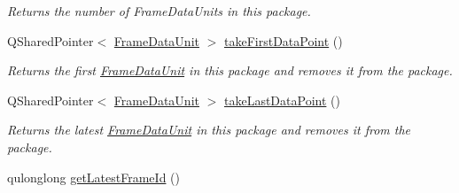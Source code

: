 \begin{DoxyCompactItemize}
\begin{DoxyCompactList}\small\item\em Returns the number of Frame\-Data\-Units in this package. \end{DoxyCompactList}\item 
\hypertarget{class_picto_1_1_frame_data_unit_package_ac9a9c94ea43a4bda078eb9ff56e3058d}{Q\-Shared\-Pointer$<$ \hyperlink{class_picto_1_1_frame_data_unit}{Frame\-Data\-Unit} $>$ \hyperlink{class_picto_1_1_frame_data_unit_package_ac9a9c94ea43a4bda078eb9ff56e3058d}{take\-First\-Data\-Point} ()}\label{class_picto_1_1_frame_data_unit_package_ac9a9c94ea43a4bda078eb9ff56e3058d}

\begin{DoxyCompactList}\small\item\em Returns the first \hyperlink{class_picto_1_1_frame_data_unit}{Frame\-Data\-Unit} in this package and removes it from the package. \end{DoxyCompactList}\item 
\hypertarget{class_picto_1_1_frame_data_unit_package_a0d962918966a9d50cf526673daabd3c1}{Q\-Shared\-Pointer$<$ \hyperlink{class_picto_1_1_frame_data_unit}{Frame\-Data\-Unit} $>$ \hyperlink{class_picto_1_1_frame_data_unit_package_a0d962918966a9d50cf526673daabd3c1}{take\-Last\-Data\-Point} ()}\label{class_picto_1_1_frame_data_unit_package_a0d962918966a9d50cf526673daabd3c1}

\begin{DoxyCompactList}\small\item\em Returns the latest \hyperlink{class_picto_1_1_frame_data_unit}{Frame\-Data\-Unit} in this package and removes it from the package. \end{DoxyCompactList}\item 
\hypertarget{class_picto_1_1_frame_data_unit_package_ae206f6078896cba47b536aadd9d7f1c4}{qulonglong \hyperlink{class_picto_1_1_frame_data_unit_package_ae206f6078896cba47b536aadd9d7f1c4}{get\-Latest\-Frame\-Id} ()}\label{class_picto_1_1_frame_data_unit_package_ae206f6078896cba47b536aadd9d7f1c4}


\end{DoxyCompactItemize}

